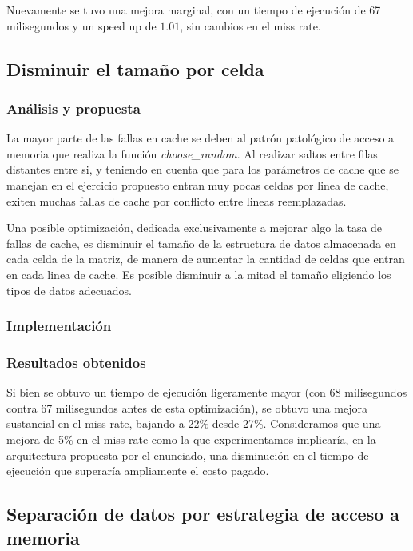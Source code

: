 \documentclass[a4paper,11pt]{article}
\begin{document}
Nuevamente se tuvo una mejora marginal, con un tiempo de ejecución de 67
milisegundos y un speed up de \(1.01\), sin cambios en el miss rate.

\subsection{Disminuir el tamaño por celda}

\subsubsection{Análisis y propuesta}

La mayor parte de las fallas en cache se deben al patrón patológico de acceso a
memoria que realiza la función \textit{choose\_random}. Al realizar saltos
entre filas distantes entre si, y teniendo en cuenta que para los parámetros de
cache que se manejan en el ejercicio propuesto entran muy pocas celdas por
linea de cache, exiten muchas fallas de cache por conflicto entre lineas
reemplazadas.

Una posible optimización, dedicada exclusivamente a mejorar algo la tasa de
fallas de cache, es disminuir el tamaño de la estructura de datos almacenada en
cada celda de la matriz, de manera de aumentar la cantidad de celdas que entran
en cada linea de cache. Es posible disminuir a la mitad el tamaño eligiendo los
tipos de datos adecuados.

\subsubsection{Implementación}



\subsubsection{Resultados obtenidos}

Si bien se obtuvo un tiempo de ejecución ligeramente mayor (con 68 milisegundos
contra 67 milisegundos antes de esta optimización), se obtuvo una mejora
sustancial en el miss rate, bajando a 22\% desde 27\%. Consideramos que una
mejora de 5\% en el miss rate como la que experimentamos implicaría, en la
arquitectura propuesta por el enunciado, una disminución en el tiempo de
ejecución que superaría ampliamente el costo pagado.

\subsection{Separación de datos por estrategia de acceso a memoria}
\end{document}
